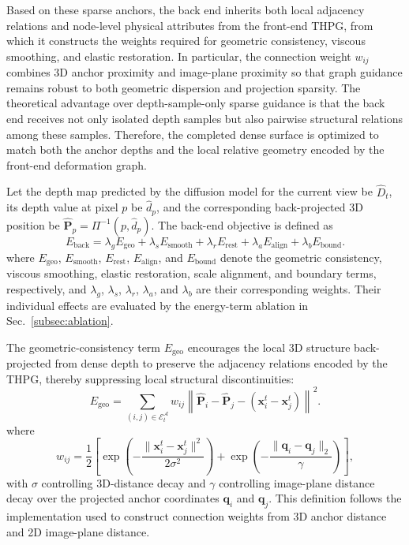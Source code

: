 \documentclass[pdflatex,sn-mathphys-num]{sn-jnl}
\begin{document}
Based on these sparse anchors, the back end inherits both local adjacency relations and node-level physical attributes from the front-end THPG, from which it constructs the weights required for geometric consistency, viscous smoothing, and elastic restoration. In particular, the connection weight $w_{ij}$ combines 3D anchor proximity and image-plane proximity so that graph guidance remains robust to both geometric dispersion and projection sparsity. The theoretical advantage over depth-sample-only sparse guidance is that the back end receives not only isolated depth samples but also pairwise structural relations among these samples. Therefore, the completed dense surface is optimized to match both the anchor depths and the local relative geometry encoded by the front-end deformation graph.

Let the depth map predicted by the diffusion model for the current view be $\hat D_t$, its depth value at pixel $p$ be $\hat d_p$, and the corresponding back-projected 3D position be $\hat{\mathbf{P}}_p=\Pi^{-1}(p,\hat d_p)$. The back-end objective is defined as
\begin{equation}
E_{\mathrm{back}} = \lambda_g E_{\mathrm{geo}} + \lambda_s E_{\mathrm{smooth}} + \lambda_r E_{\mathrm{rest}} + \lambda_a E_{\mathrm{align}} + \lambda_b E_{\mathrm{bound}}.
\label{eq:eback}
\end{equation}
where $E_{\mathrm{geo}}$, $E_{\mathrm{smooth}}$, $E_{\mathrm{rest}}$, $E_{\mathrm{align}}$, and $E_{\mathrm{bound}}$ denote the geometric consistency, viscous smoothing, elastic restoration, scale alignment, and boundary terms, respectively, and $\lambda_g$, $\lambda_s$, $\lambda_r$, $\lambda_a$, and $\lambda_b$ are their corresponding weights. Their individual effects are evaluated by the energy-term ablation in Sec.~\ref{subsec:ablation}.

The geometric-consistency term $E_{\mathrm{geo}}$ encourages the local 3D structure back-projected from dense depth to preserve the adjacency relations encoded by the THPG, thereby suppressing local structural discontinuities:
\begin{equation}
E_{\mathrm{geo}} = \sum_{(i,j)\in\mathcal{E}_t^{\mathcal{A}}} w_{ij} \left\lVert \hat{\mathbf{P}}_i - \hat{\mathbf{P}}_j - \left(\mathbf{x}_i^t - \mathbf{x}_j^t\right) \right\rVert^2.
\label{eq:geo}
\end{equation}
where
\begin{equation}
 w_{ij} = \frac{1}{2}\left[\exp\!\left(-\frac{\lVert \mathbf{x}_i^t-\mathbf{x}_j^t \rVert^2}{2\sigma^2}\right) + \exp\!\left(-\frac{\lVert \mathbf{q}_i-\mathbf{q}_j \rVert_2}{\gamma}\right)\right],
\label{eq:wij}
\end{equation}
with $\sigma$ controlling 3D-distance decay and $\gamma$ controlling image-plane distance decay over the projected anchor coordinates $\mathbf{q}_i$ and $\mathbf{q}_j$. This definition follows the implementation used to construct connection weights from 3D anchor distance and 2D image-plane distance.
\end{document}
